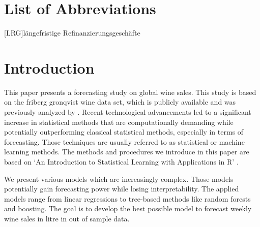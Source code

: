 \documentclass[11pt,]{article}
\begin{document}
\newpage
\listoffigures
{}

\listoftables
{}

\section*{List of Abbreviations}

\begin{adjustwidth}{1.5em}{0pt}

\begin{acronym}[dummyyyy]
 [LRG]{längefristige Refinanzierungsgeschäfte}

\end{acronym}

\end{adjustwidth}

\restoregeometry

\newpage
{}
\hypertarget{introduction}{%
\section{Introduction}\label{introduction}}

This paper presents a forecasting study on global wine sales. This study
is based on the friberg gronqvist wine data set, which is publicly
available and was previously analyzed by
\textcite[][p. 193f.]{Friberg2012}. Recent technological advancements
led to a significant increase in statistical methods that are
computationally demanding while potentially outperforming classical
statistical methods, especially in terms of forecasting. Those
techniques are usually referred to as statistical or machine learning
methods. The methods and procedures we introduce in this paper are based
on `An Introduction to Statistical Learning with Applications in R'
\autocite[][]{James2014}.

We present various models which are increasingly complex. Those models
potentially gain forecasting power while losing interpretability. The
applied models range from linear regressions to tree-based methods like
random forests and boosting. The goal is to develop the best possible
model to forecast weekly wine sales in litre in out of sample data.
\end{document}
